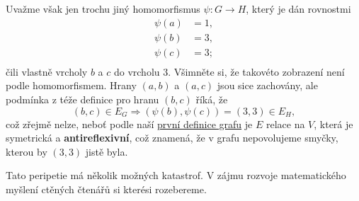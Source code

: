Uvažme však jen trochu jiný homomorfismus $\psi: G \to H$, který je dán
rovnostmi
\begin{equation*}
 \begin{split}
  \psi(a) &= 1, \\
  \psi(b) &= 3, \\
  \psi(c) &= 3; \\
 \end{split}
\end{equation*}
čili vlastně  vrcholy $b$ a $c$ do vrcholu $3$. Všimněte si, že
takovéto zobrazení není podle 
homomorfismem. Hrany $(a,b)$ a $(a,c)$ jsou sice zachovány, ale podmínka z téže
definice pro hranu $(b,c)$ říká, že
\[
 (b,c) \in E_G \Rightarrow (\psi(b),\psi(c)) = (3,3) \in E_H,
\]
což zřejmě nelze, neboť podle naší \hyperref[def:graf-poprve]{první definice
grafu} je $E$ relace na $V$, která je symetrická a \textbf{antireflexivní}, což
znamená, že v grafu nepovolujeme smyčky, kterou by $(3,3)$ jistě byla.

Tato peripetie má několik možných katastrof. V zájmu rozvoje matematického
myšlení ctěných čtenářů si kterési rozebereme.


